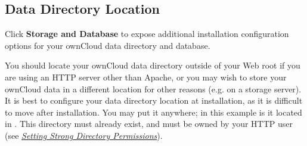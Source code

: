 \documentclass[letterpaper,10pt,english]{sphinxmanual}
\begin{document}
\subsection{Data Directory Location}
\label{installation/installation_wizard:data-directory-location}\label{installation/installation_wizard:data-directory-location-label}
Click \textbf{Storage and Database} to expose additional installation configuration
options for your ownCloud data directory and database.
\begin{figure}[htbp]
\centering

\end{figure}

You should locate your ownCloud data directory outside of your Web root if you
are using an HTTP server other than Apache, or you may wish to store your
ownCloud data in a different location for other reasons (e.g. on a storage
server). It is best to configure your data directory location at installation,
as it is difficult to move after installation. You may put it anywhere; in this
example is it located in . This directory must already exist,
and must be owned by your HTTP user (see
{\hyperref[installation/installation_wizard:strong-perms-label]{\emph{Setting Strong Directory Permissions}}}).
\end{document}
